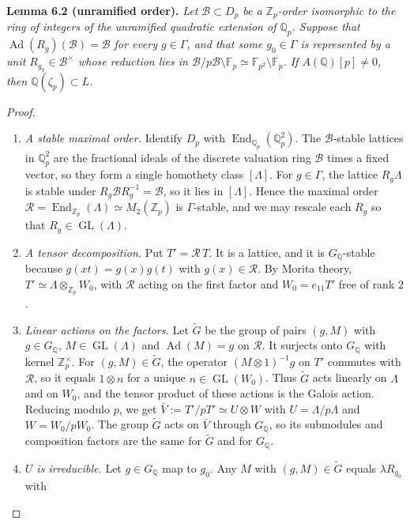 \documentclass[11pt]{article}
\newcommand{\Q}{\mathbb Q}
\newcommand{\Z}{\mathbb Z}
\newcommand{\F}{\mathbb F}
\DeclareMathOperator{\End}{End}
\DeclareMathOperator{\Ad}{Ad}
\DeclareMathOperator{\GL}{GL}
\begin{document}
\noindent\textbf{Lemma 6.2 (unramified order).}
\emph{Let \(\mathcal B\subset D_p\) be a \(\Z_p\)-order isomorphic to
the ring of integers of the unramified quadratic extension of \(\Q_p\).
Suppose that \(\Ad(R_g)(\mathcal B)=\mathcal B\) for every
\(g\in\Gamma\), and that some \(g_0\in\Gamma\) is represented by a unit
\(R_{g_0}\in\mathcal B^\times\) whose reduction lies in
\(\mathcal B/p\mathcal B\setminus\F_p\simeq\F_{p^2}\setminus\F_p\). If
\(A(\Q)[p]\ne0\), then \(\Q(\zeta_p)\subset L\).}

\begin{proof}
\begin{enumerate}
\item \emph{A stable maximal order.} Identify \(D_p\) with
\(\End_{\Q_p}(\Q_p^2)\). The \(\mathcal B\)-stable lattices in
\(\Q_p^2\) are the fractional ideals of the discrete valuation ring
\(\mathcal B\) times a fixed vector, so they form a single homothety
class \([\Lambda]\). For \(g\in\Gamma\), the lattice \(R_g\Lambda\) is
stable under \(R_g\mathcal BR_g^{-1}=\mathcal B\), so it lies in
\([\Lambda]\). Hence the maximal order
\(\mathcal R=\End_{\Z_p}(\Lambda)\simeq M_2(\Z_p)\) is
\(\Gamma\)-stable, and we may rescale each \(R_g\) so that
\(R_g\in\GL(\Lambda)\).
\item \emph{A tensor decomposition.} Put \(T'=\mathcal R\,T\). It is a
lattice, and it is \(G_{\Q}\)-stable because \(g(xt)=g(x)g(t)\) with
\(g(x)\in\mathcal R\). By Morita theory,
\(T'\simeq\Lambda\otimes_{\Z_p}W_0\), with \(\mathcal R\) acting on the
first factor and \(W_0=e_{11}T'\) free of rank \(2\).
\item \emph{Linear actions on the factors.} Let \(\widetilde G\) be the
group of pairs \((g,M)\) with \(g\in G_{\Q}\), \(M\in\GL(\Lambda)\) and
\(\Ad(M)=g\) on \(\mathcal R\). It surjects onto \(G_{\Q}\) with kernel
\(\Z_p^\times\). For \((g,M)\in\widetilde G\), the operator
\((M\otimes1)^{-1}g\) on \(T'\) commutes with \(\mathcal R\), so it
equals \(1\otimes n\) for a unique \(n\in\GL(W_0)\). Thus
\(\widetilde G\) acts linearly on \(\Lambda\) and on \(W_0\), and the
tensor product of these actions is the Galois action. Reducing modulo
\(p\), we get \(\bar V:=T'/pT'\simeq U\otimes W\) with
\(U=\Lambda/p\Lambda\) and \(W=W_0/pW_0\). The group \(\widetilde G\)
acts on \(\bar V\) through \(G_{\Q}\), so its submodules and
composition factors are the same for \(\widetilde G\) and for
\(G_{\Q}\).
\item \emph{\(U\) is irreducible.} Let \(g\in G_{\Q}\) map to \(g_0\).
Any \(M\) with \((g,M)\in\widetilde G\) equals \(\lambda R_{g_0}\) with

\end{enumerate}
\end{proof}
\end{document}

